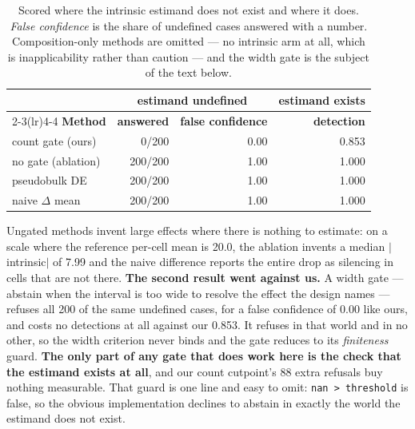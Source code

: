 \documentclass{article}
\begin{document}
\begin{table}[h]
\small
\centering
\caption{Scored where the intrinsic estimand does not exist and where it does.
\emph{False confidence} is the share of undefined cases answered with a number.
Composition-only methods are omitted --- no intrinsic arm at all, which is
inapplicability rather than caution --- and the width gate is the subject of the
text below.}
\label{tab:bench}
\begin{tabular}{@{}lrrr@{}}
\toprule
& \multicolumn{2}{c}{\textbf{estimand undefined}} &
\textbf{estimand exists} \\
\cmidrule(lr){2-3}\cmidrule(lr){4-4}
\textbf{Method} & \textbf{answered} & \textbf{false confidence} &
\textbf{detection} \\
\midrule
count gate (ours)   & 0/200   & 0.00 & 0.853 \\
no gate (ablation)  & 200/200 & 1.00 & 1.000 \\
pseudobulk DE       & 200/200 & 1.00 & 1.000 \\
naive $\Delta$ mean & 200/200 & 1.00 & 1.000 \\
\bottomrule
\end{tabular}
\end{table}

Ungated methods invent large effects where there is nothing to estimate: on a
scale where the reference per-cell mean is 20.0, the ablation invents a median
$|$intrinsic$|$ of 7.99 and the naive difference reports the entire drop as
silencing in cells that are not there. \textbf{The
second result went against us.} A width gate --- abstain when the interval is too
wide to resolve the effect the design names --- refuses all 200 of the same
undefined cases, for a false confidence of 0.00 like ours, and costs no
detections at all against our 0.853. It refuses in that world and in no other,
so the width criterion never binds and the gate reduces to its \emph{finiteness}
guard. \textbf{The only part of any gate that does work here is the check that
the estimand exists at all}, and our count cutpoint's 88 extra refusals buy
nothing measurable. That guard is one line and easy to omit: \texttt{nan >
threshold} is false, so the obvious implementation declines to abstain in exactly
the world the estimand does not exist.
\end{document}
